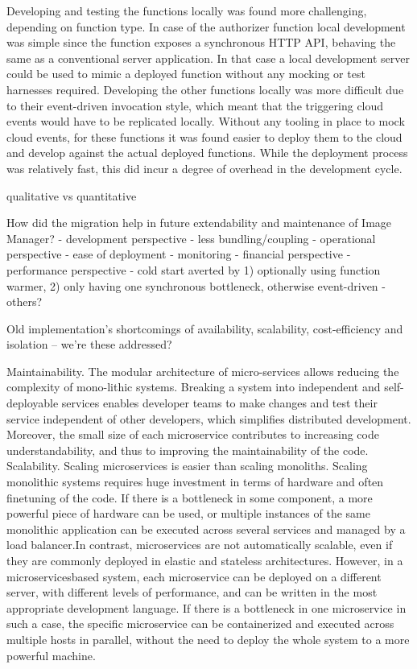 Developing and testing the functions locally was found more challenging, depending on function type. In case of the authorizer function local development was simple since the function exposes a synchronous HTTP API, behaving the same as a conventional server application. In that case a local development server could be used to mimic a deployed function without any mocking or test harnesses required. Developing the other functions locally was more difficult due to their event-driven invocation style, which meant that the triggering cloud events would have to be replicated locally. Without any tooling in place to mock cloud events, for these functions it was found easier to deploy them to the cloud and develop against the actual deployed functions. While the deployment process was relatively fast, this did incur a degree of overhead in the development cycle.



qualitative vs quantitative

How did the migration help in future extendability and maintenance of Image Manager?
- development perspective
  - less bundling/coupling
- operational perspective
  - ease of deployment
  - monitoring
- financial perspective
- performance perspective
  - cold start averted by 1) optionally using function warmer, 2) only having one synchronous bottleneck, otherwise event-driven
- others?

Old implementation's shortcomings of availability, scalability, cost-efficiency and isolation -- we're these addressed?

Maintainability. The modular architecture of micro-services  allows  reducing  the  complexity  of  mono-lithic  systems.  Breaking  a  system  into  independent  and    self-deployable    services    enables    developer    teams  to  make  changes  and  test  their  service  independent  of  other  developers,  which  simplifies  distributed  development.  Moreover,  the  small  size  of  each  microservice  contributes  to  increasing  code understandability,  and  thus  to  improving  the  maintainability of the code.
Scalability. Scaling microservices is easier than scaling  monoliths.  Scaling  monolithic  systems  requires  huge  investment  in  terms  of  hardware  and  often  finetuning  of  the  code.  If  there  is  a  bottleneck  in  some  component,  a  more  powerful  piece  of  hardware can be used, or multiple instances of the same monolithic  application  can  be  executed  across  several services and managed by a load balancer.In   contrast,   microservices   are   not   automatically  scalable,  even  if  they  are  commonly  deployed  in  elastic  and  stateless  architectures.  However,  in  a  microservicesbased  system,  each  microservice  can  be deployed on a different server, with different levels of  performance,  and  can  be  written  in  the  most  appropriate  development  language.  If  there  is  a  bottleneck  in  one  microservice  in  such  a  case,  the  specific microservice can be containerized and executed across multiple hosts in parallel, without the need to deploy the whole system to a more powerful machine.

